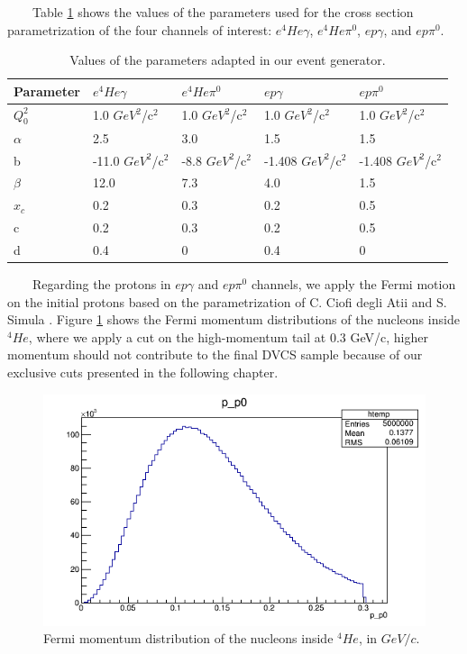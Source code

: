 ~~~~Table \ref{Table:event_generator_values} shows the values of the parameters used for the cross section parametrization of the four channels of interest: $e^{4}He\gamma$, $e^{4}He\pi^{0}$, $ep\gamma$, and $ep\pi^{0}$.

\begin {table}[tbp]
\begin{center}
\begin{tabular}{|l|l|l|l|l|}
\hline
Parameter & $e^{4}He\gamma$  & $e^{4}He\pi^{0}$ & $ep\gamma$  & $ep\pi^{0}$ \\
\hline
$Q^{2}_{0}$ & 1.0 $GeV^{2}$/c$^{2}$ & 1.0 $GeV^{2}$/c$^{2}$ & 1.0 $GeV^{2}$/c$^{2}$ & 1.0 $GeV^{2}$/c$^{2}$ \\
\hline
$\alpha$ & 2.5 & 3.0 & 1.5 & 1.5 \\
\hline
b & -11.0 $GeV^{2}$/c$^{2}$ & -8.8 $GeV^{2}$/c$^{2}$ & -1.408 $GeV^{2}$/c$^{2}$& -1.408 $GeV^{2}$/c$^{2}$\\
\hline
$\beta$ & 12.0 & 7.3 & 4.0 & 1.5\\
\hline
$x_{c}$ & 0.2 & 0.3 & 0.2 & 0.5\\
\hline
c & 0.2 & 0.3 & 0.2 & 0.5 \\
\hline
d & 0.4 & 0 & 0.4 & 0 \\
\hline
\end{tabular}
\caption{ Values of the parameters adapted in our event generator.}
\label{Table:event_generator_values}
\end{center}
\end{table}

~~~~Regarding the protons in $ep\gamma$ and $ep\pi^{0}$ channels, we apply the 
Fermi motion on the initial protons based on the parametrization of C. Ciofi 
degli Atii and S. Simula \cite{fermi_motion}. Figure \ref{fig:fermi_mom} shows 
the Fermi momentum distributions of the nucleons inside $^{4}He$, where we 
apply a cut on the high-momentum tail at 0.3 GeV/c, higher momentum should not 
contribute to the final DVCS sample because of our exclusive cuts presented in 
the following chapter. 

\begin{figure}[tbp]
\centering
\includegraphics[scale=.55]{fig_analysis/fermi_momentum_dis.png}
\caption{ Fermi momentum distribution of the nucleons inside $^{4}He$, in 
$GeV/c$.} \label{fig:fermi_mom}
\end{figure}



